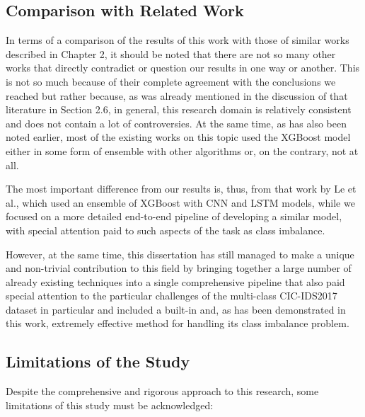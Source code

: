\subsection{Comparison with Related Work}

In terms of a comparison of the results of this work with those of similar works described in Chapter 2, it should be noted that there are not so many other works that directly contradict or question our results in one way or another. This is not so much because of their complete agreement with the conclusions we reached but rather because, as was already mentioned in the discussion of that literature in Section 2.6, in general, this research domain is relatively consistent and does not contain a lot of controversies. At the same time, as has also been noted earlier, most of the existing works on this topic used the XGBoost model either in some form of ensemble with other algorithms or, on the contrary, not at all.

The most important difference from our results is, thus, from that work by Le et al.\parencite{le2021ensemble}, which used an ensemble of XGBoost with CNN and LSTM models, while we focused on a more detailed end-to-end pipeline of developing a similar model, with special attention paid to such aspects of the task as class imbalance.

However, at the same time, this dissertation has still managed to make a unique and non-trivial contribution to this field by bringing together a large number of already existing techniques into a single comprehensive pipeline that also paid special attention to the particular challenges of the multi-class CIC-IDS2017 dataset in particular and included a built-in and, as has been demonstrated in this work, extremely effective method for handling its class imbalance problem.

\subsection{Limitations of the Study}

Despite the comprehensive and rigorous approach to this research, some limitations of this study must be acknowledged:

